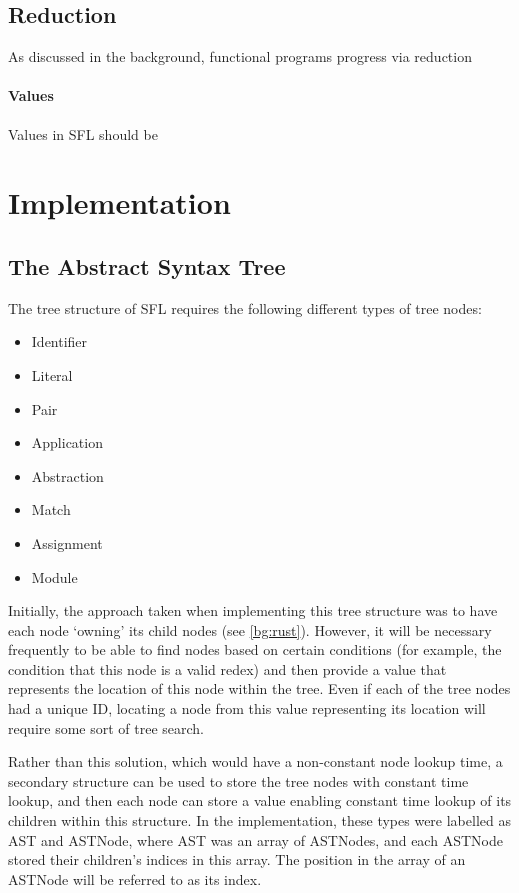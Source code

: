 \subsection{Reduction}
As discussed in the background, functional programs progress via reduction
\paragraph{Values}
\label{design:values}
Values in \ac{SFL} should be 

\section{Implementation}
\subsection{The Abstract Syntax Tree}
The tree structure of \ac{SFL} requires the following different types of tree nodes:
\begin{itemize}
    \item Identifier
    \item Literal
    \item Pair
    \item Application
    \item Abstraction
    \item Match
    \item Assignment
    \item Module
\end{itemize}
Initially, the approach taken when implementing this tree structure was to have each node `owning' its child nodes (see \ref{bg:rust}). However, it will be necessary frequently to be able to find nodes based on certain conditions (for example, the condition that this node is a valid redex) and then provide a value that represents the location of this node within the tree. Even if each of the tree nodes had a unique ID, locating a node from this value representing its location will require some sort of tree search.

Rather than this solution, which would have a non-constant node lookup time, a secondary structure can be used to store the tree nodes with constant time lookup, and then each node can store a value enabling constant time lookup of its children within this structure. In the implementation, these types were labelled as AST and ASTNode, where AST was an array of ASTNodes, and each ASTNode stored their children's indices in this array. The position in the array of an ASTNode will be referred to as its index.

